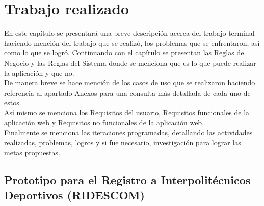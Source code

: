 \chapter{Trabajo realizado}

	\noident En este capítulo se presentará una breve descripción acerca del trabajo terminal haciendo mención del trabajo que se realizó, los problemas que se enfrentaron, así como lo que se logró. Continuando con el capítulo se presentan las Reglas de Negocio y las Reglas del Sistema donde se menciona que es lo que puede realizar la aplicación y que no.\\
	De manera breve  se hace mención de los casos de uso que se realizaron haciendo referencia al apartado Anexos para una consulta más detallada de cada uno de estos.\\
	Así mismo se menciona los Requisitos del usuario, Requisitos funcionales de la aplicación web y Requisitos no funcionales de la aplicación web.\\
	Finalmente se menciona las iteraciones programadas, detallando las actividades realizadas, problemas, logros y si fue necesario, investigación para lograr las metas propuestas.\\
	
	
	\section{Prototipo para el Registro a Interpolit\'ecnicos Deportivos (RIDESCOM)}
	
